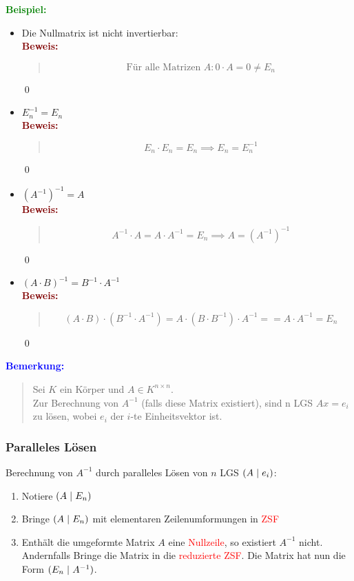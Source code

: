 \documentclass{article}
\newcommand{\smsp}{\phantom{\hspace{3px}}}
\newcommand{\red}[1]{\textcolor{red}{#1}}
\newcommand{\blue}[1]{\textcolor{blue}{#1}}
\newcommand{\green}[1]{\textcolor{green}{#1}}
\newcommand{\maroon}[1]{\textcolor{maroon}{#1}}
\newcommand{\ex}{\green{\textbf{Beispiel: }}}
\newcommand{\an}[1]{\blue{\textbf{Bemerkung: }}\begin{quote}#1\end{quote}}
\newcommand{\pr}[1]{\maroon{\textbf{Beweis: }}\begin{quote}#1\end{quote}\qed}
\renewcommand{\st}{\smsp | \smsp}
\begin{document}
\ex
\begin{itemize}
    \item Die Nullmatrix ist nicht invertierbar:\\
    \pr{
        \vspace{-15px}
        \[
            \text{Für alle Matrizen } A: 0 \cdot A = 0 \neq E_n   
        \]
    }
    \item $E_n^{-1} = E_n$\\
    \pr{
        \vspace{-15px}
        \[
            E_n \cdot E_n = E_n \implies E_n = E_n^{-1}   
        \]
    }
    \item ${(A^{-1})}^{-1} = A$\\
    \pr{
        \vspace{-15px}
        \[
            A^{-1} \cdot A = A \cdot A^{-1} = E_n \implies A = {(A^{-1})}^{-1}
        \]
    }
    \item $(A \cdot B)^{-1} = B^{-1} \cdot A^{-1}$\\
    \pr{
        \vspace{-15px}
        \[
            (A \cdot B) \cdot (B^{-1} \cdot A^{-1}) = A \cdot (B \cdot B^{-1}) \cdot A^{-1} = = A \cdot A^{-1} = E_n
        \]
    }
\end{itemize}

\an{
    Sei $K$ ein Körper und $A \in K^{n \times n}$.\\
    Zur Berechnung von $A^{-1}$ (falls diese Matrix existiert), sind n LGS $Ax = e_i$ zu lösen, wobei $e_i$ der $i$-te Einheitsvektor ist.
}

\newpage
\subsubsection{Paralleles Lösen}

Berechnung von $A^{-1}$ durch paralleles Lösen von $n$ LGS $(A \st e_i)$:
\begin{enumerate}
    \item Notiere \red{$(A \st E_n)$}
    \item Bringe $(A \st E_n)$ mit elementaren Zeilenumformungen in \red{ZSF}
    \item Enthält die umgeformte Matrix $A$ eine \red{Nullzeile}, so existiert $A^{-1}$ nicht.\\
    Andernfalls Bringe die Matrix in die \red{reduzierte ZSF}. Die Matrix hat nun die Form \red{$(E_n \st A^{-1})$}.
\end{enumerate}
\end{document}
